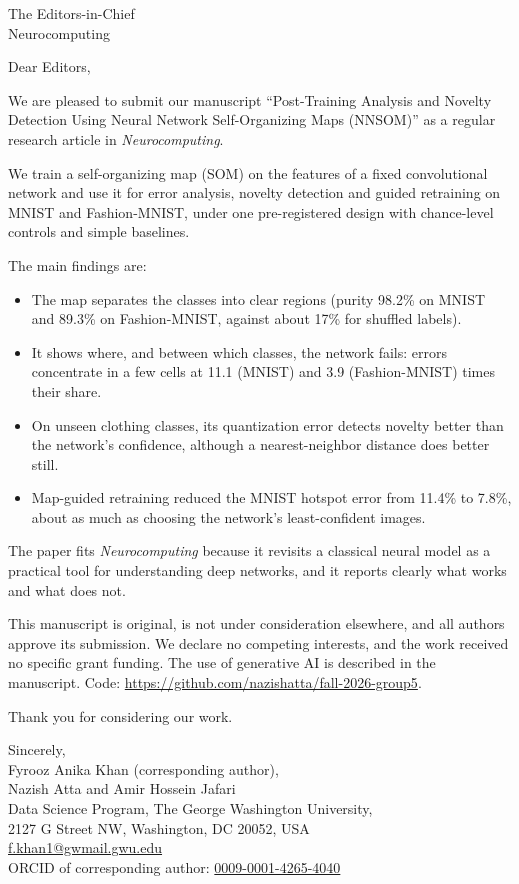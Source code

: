 \documentclass[11pt]{letter}
\date{\today}
\begin{document}
\begin{letter}{The Editors-in-Chief\\ Neurocomputing}

\opening{Dear Editors,}
\setlength{\longindentation}{0pt}\setlength{\indentedwidth}{\textwidth}

We are pleased to submit our manuscript ``Post-Training Analysis and Novelty Detection Using Neural Network Self-Organizing Maps (NNSOM)'' as a regular research article in \emph{Neurocomputing}.

We train a self-organizing map (SOM) on the features of a fixed convolutional network and use it for error analysis, novelty detection and guided retraining on MNIST and Fashion-MNIST, under one pre-registered design with chance-level controls and simple baselines.

The main findings are:
\begin{itemize}
  \item The map separates the classes into clear regions (purity 98.2\% on MNIST and 89.3\% on Fashion-MNIST, against about 17\% for shuffled labels).
  \item It shows where, and between which classes, the network fails: errors concentrate in a few cells at 11.1 (MNIST) and 3.9 (Fashion-MNIST) times their share.
  \item On unseen clothing classes, its quantization error detects novelty better than the network's confidence, although a nearest-neighbor distance does better still.
  \item Map-guided retraining reduced the MNIST hotspot error from 11.4\% to 7.8\%, about as much as choosing the network's least-confident images.
\end{itemize}

The paper fits \emph{Neurocomputing} because it revisits a classical neural model as a practical tool for understanding deep networks, and it reports clearly what works and what does not.

This manuscript is original, is not under consideration elsewhere, and all authors approve its submission. We declare no competing interests, and the work received no specific grant funding. The use of generative AI is described in the manuscript. Code: \url{https://github.com/nazishatta/fall-2026-group5}.

Thank you for considering our work.

\closing{Sincerely,\\[4pt]
Fyrooz Anika Khan (corresponding author),\\
Nazish Atta and Amir Hossein Jafari\\
Data Science Program, The George Washington University,\\
2127 G Street NW, Washington, DC 20052, USA\\
\href{mailto:f.khan1@gwmail.gwu.edu}{f.khan1@gwmail.gwu.edu}\\
ORCID of corresponding author: \href{https://orcid.org/0009-0001-4265-4040}{0009-0001-4265-4040}}

\end{letter}
\end{document}

